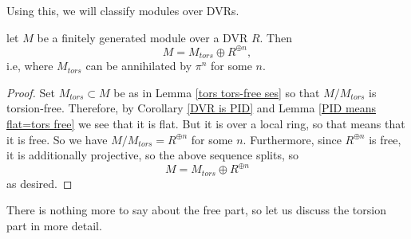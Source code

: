 Using this, we will classify modules over DVRs.

\begin{proposition} let $M$ be a finitely generated module over a DVR $R$. Then
\[M=M_{tors}\oplus R^{\oplus n},\] i.e, where $M_{tors}$ can be annihilated by $\pi^n$ for some $n$.
\end{proposition}
\begin{proof}
Set $M_{tors} \subset M$ be as in Lemma \ref{tors tors-free ses} so that $M/M_{tors}$ is torsion-free. Therefore, by Corollary \ref{DVR is PID} and Lemma \ref{PID means flat=tors free} we see that it is flat. But it is over a local ring, so that means that it is free. So we have $M/M_{tors}=R^{\oplus n}$ for some $n$. Furthermore, since $R^{\oplus n}$ is free, it is additionally projective, so the above sequence splits, so
\[M=M_{tors} \oplus R^{\oplus n}\]
as desired.
\end{proof}

There is nothing more to say about the free part, so let us discuss the torsion part in more detail.

